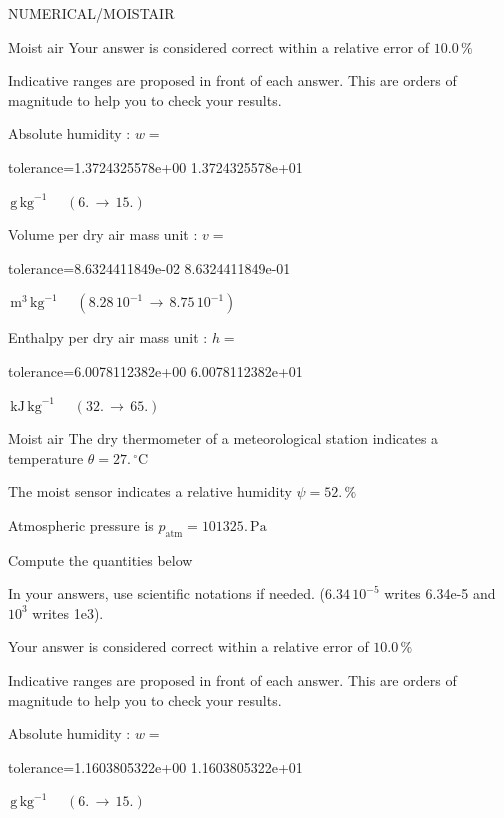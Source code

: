\documentclass[12pt]{article}
\begin{document}
\begin{quiz}{NUMERICAL/MOISTAIR}
\begin{cloze}{Moist air}
Your answer is considered correct within a relative error of $10.0\, \% $

Indicative ranges are proposed in front of each answer. This are orders of magnitude to help you to check your results.

Absolute humidity : $w =  $
\begin{numerical}[points=1] 
\item[tolerance={1.3724325578e+00}] 1.3724325578e+01 
\end{numerical} 
 $\,  \mathrm{g}\,  \mathrm{kg}^{-1}$ 
 $ \quad (6. \, \rightarrow \, 15.) $ 

Volume per dry air mass unit : $v =  $
\begin{numerical}[points=1] 
\item[tolerance={8.6324411849e-02}] 8.6324411849e-01 
\end{numerical} 
 $\,  \mathrm{m}^{3}\,  \mathrm{kg}^{-1}$ 
 $ \quad ( 8.28 \, 10^{-1}  \, \rightarrow \,  8.75 \, 10^{-1} ) $ 

Enthalpy per dry air mass unit : $h =  $
\begin{numerical}[points=2] 
\item[tolerance={6.0078112382e+00}] 6.0078112382e+01 
\end{numerical} 
 $\,  \mathrm{kJ}\,  \mathrm{kg}^{-1}$ 
 $ \quad (32. \, \rightarrow \, 65.) $ 

\end{cloze} 


 \begin{cloze}{Moist air} 
The dry thermometer of a meteorological station indicates a temperature $\theta = 27.\,  \mathrm{^\circ\mathrm{C}} $

The moist sensor indicates a relative humidity $\psi = 52.\, \% $

Atmospheric pressure is $p_{\text{atm}} = 101325.\,  \mathrm{Pa} $

 

Compute the quantities below

In your answers, use scientific notations if needed.  ($6.34\, 10^{-5}$ writes 6.34e-5 and $10^{3}$ writes 1e3).

Your answer is considered correct within a relative error of $10.0\, \% $

Indicative ranges are proposed in front of each answer. This are orders of magnitude to help you to check your results.

Absolute humidity : $w =  $
\begin{numerical}[points=1] 
\item[tolerance={1.1603805322e+00}] 1.1603805322e+01 
\end{numerical} 
 $\,  \mathrm{g}\,  \mathrm{kg}^{-1}$ 
 $ \quad (6. \, \rightarrow \, 15.) $ 


\end{cloze}
\end{quiz}
\end{document}
